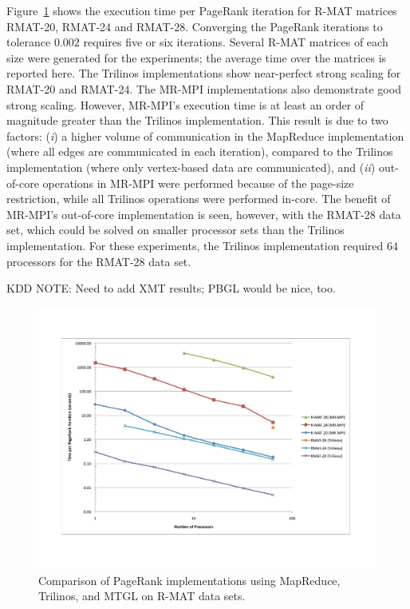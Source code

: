 Figure~\ref{f:pr} shows the execution time per PageRank iteration for
R-MAT matrices RMAT-20, RMAT-24 and RMAT-28.  
Converging the PageRank iterations
to tolerance $0.002$ requires five or six iterations.
Several R-MAT matrices of 
each size were generated for the experiments; the average time over the
matrices is reported here.  
The Trilinos implementations show near-perfect
strong scaling for RMAT-20 and RMAT-24.  The MR-MPI 
implementations also demonstrate good strong scaling.  However, MR-MPI's
execution time is at least an order of magnitude greater than the Trilinos
implementation.  This result is due to two factors:  ({\it i}) a 
higher volume of
communication in the MapReduce implementation (where all edges are communicated
in each iteration), compared to the Trilinos implementation (where only
vertex-based data are communicated), and ({\it ii}) out-of-core operations
in MR-MPI were performed because of the page-size restriction, while all
Trilinos operations were performed in-core.  The benefit of MR-MPI's
out-of-core implementation is seen, however, with the RMAT-28 data set, 
which could be solved on smaller processor sets than the Trilinos 
implementation.  For these experiments, the Trilinos implementation required
64 processors for the RMAT-28 data set. 

KDD NOTE:  Need to add XMT results; PBGL would be nice, too.


\begin{figure}[h!]
\includegraphics[width=\textwidth]{fig_pagerank.pdf}
\caption{Comparison of PageRank implementations using MapReduce,
Trilinos, and MTGL on R-MAT data sets.}
\label{f:pr}
\end{figure}


